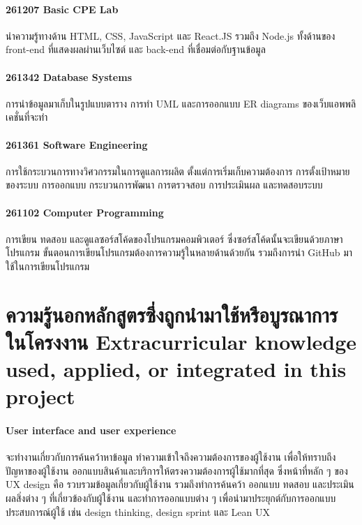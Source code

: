 \paragraph{261207 Basic CPE Lab}
นำความรู้ทางด้าน HTML, CSS, JavaScript และ React.JS รวมถึง Node.js 
ทั้งด้านของ front-end ที่แสดงผลผ่านเว็บไซต์ และ back-end ที่เชื่อมต่อกับฐานข้อมูล

\paragraph{261342 Database Systems}
การนำข้อมูลมาเก็บในรูปแบบตาราง การทำ UML และการออกแบบ ER diagrams ของเว็บแอพพลิเคชั่นที่จะทำ

\paragraph{261361 Software Engineering}
การใช้กระบวนการทางวิศวกรรมในการดูแลการผลิต ตั้งแต่การเริ่มเก็บความต้องการ การตั้งเป้าหมายของระบบ 
การออกแบบ กระบวนการพัฒนา การตรวจสอบ การประเมินผล และทดสอบระบบ

\paragraph{261102 Computer Programming}
การเขียน ทดสอบ และดูแลซอร์สโค้ดของโปรแกรมคอมพิวเตอร์ ซึ่งซอร์สโค้ดนั้นจะเขียนด้วยภาษาโปรแกรม 
ขั้นตอนการเขียนโปรแกรมต้องการความรู้ในหลายด้านด้วยกัน รวมถึงการนำ GitHub มาใช้ในการเขียนโปรแกรม

\section{\ifcpe%
ความรู้นอกหลักสูตรซึ่งถูกนำมาใช้หรือบูรณาการในโครงงาน
\else%
Extracurricular knowledge used, applied, or integrated in this project
\fi
}
\paragraph{User interface and user experience}
จะทำงานเกี่ยวกับการค้นคว้าหาข้อมูล ทำความเข้าใจถึงความต้องการของผู้ใช้งาน เพื่อให้ทราบถึงปัญหาของผู้ใช้งาน
ออกแบบสินค้าและบริการให้ตรงความต้องการผู้ใช้มากที่สุด ซึ่งหน้าที่หลัก ๆ ของ UX design คือ 
รวบรวมข้อมูลเกี่ยวกับผู้ใช้งาน รวมถึงทำการค้นคว้า ออกแบบ ทดสอบ และประเมินผลสิ่งต่าง ๆ 
ที่เกี่ยวข้องกับผู้ใช้งาน และทำการออกแบบต่าง ๆ เพื่อนำมาประยุกต์กับการออกแบบประสบการณ์ผู้ใช้
 เช่น design thinking, design sprint และ Lean UX
